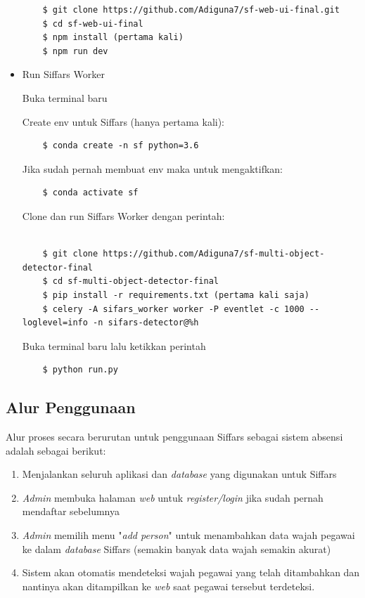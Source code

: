 \begin{itemize}
\begin{lstlisting}
    $ git clone https://github.com/Adiguna7/sf-web-ui-final.git
    $ cd sf-web-ui-final
    $ npm install (pertama kali)
    $ npm run dev
  \end{lstlisting}

  \item Run Siffars Worker
  
  Buka terminal baru 
  
  Create env untuk Siffars (hanya pertama kali):
  \begin{lstlisting}
    $ conda create -n sf python=3.6
  \end{lstlisting}
  Jika sudah pernah membuat env maka untuk mengaktifkan:
  \begin{lstlisting}
    $ conda activate sf
  \end{lstlisting}
  Clone dan run Siffars Worker dengan perintah:
  \begin{lstlisting}

    $ git clone https://github.com/Adiguna7/sf-multi-object-detector-final
    $ cd sf-multi-object-detector-final
    $ pip install -r requirements.txt (pertama kali saja)
    $ celery -A sifars_worker worker -P eventlet -c 1000 --loglevel=info -n sifars-detector@%h
  \end{lstlisting}

  Buka terminal baru lalu ketikkan perintah

  \begin{lstlisting}
    $ python run.py
  \end{lstlisting}

\end{itemize}

\subsection{Alur Penggunaan}
Alur proses secara berurutan untuk penggunaan Siffars sebagai sistem absensi adalah sebagai berikut:
\begin{enumerate}
\item Menjalankan seluruh aplikasi dan \textit{database} yang digunakan untuk Siffars
\item \textit{Admin} membuka halaman \textit{web} untuk \textit{register/login} jika sudah pernah mendaftar sebelumnya
\item \textit{Admin} memilih menu "\textit{add person}" untuk menambahkan data wajah pegawai ke dalam \textit{database} Siffars (semakin banyak data wajah semakin akurat)
\item Sistem akan otomatis mendeteksi wajah pegawai yang telah ditambahkan
dan nantinya akan ditampilkan ke \textit{web} saat pegawai tersebut terdeteksi.
\end{enumerate}

